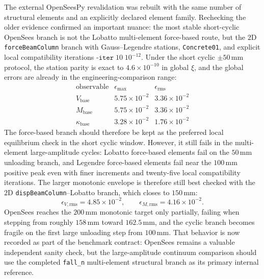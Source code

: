 The external OpenSeesPy revalidation was rebuilt with the same number of
structural elements and an explicitly declared element family.  Rechecking the
older evidence confirmed an important nuance: the most stable short-cyclic
OpenSees branch is not the Lobatto multi-element force-based route, but the
\(2\mathrm{D}\) \texttt{forceBeamColumn} branch with Gauss--Legendre stations,
\texttt{Concrete01}, and explicit local compatibility iterations
\(\texttt{-iter}\;10\;10^{-12}\).  Under the short cyclic
\(\pm 50\,\mathrm{mm}\) protocol, the station parity is exact to
\(4.6\times10^{-10}\) in global \(\xi\), and the global errors are already in
the engineering-comparison range:
\[
\begin{array}{l|r|r}
\text{observable} & \epsilon_{\max} & \epsilon_{\mathrm{rms}}\\
\hline
V_{\mathrm{base}} & 5.75\times10^{-2} & 3.36\times10^{-2}\\
M_{\mathrm{base}} & 5.75\times10^{-2} & 3.36\times10^{-2}\\
\kappa_{\mathrm{base}} & 3.28\times10^{-2} & 1.76\times10^{-2}
\end{array}
\]
The force-based branch should therefore be kept as the preferred local
equilibrium check in the short cyclic window.  However, it still fails in the
multi-element large-amplitude cycles: Lobatto force-based elements fail on the
\(50\,\mathrm{mm}\) unloading branch, and Legendre force-based elements fail
near the \(100\,\mathrm{mm}\) positive peak even with finer increments and
twenty-five local compatibility iterations.  The larger monotonic envelope is
therefore still best checked with the \(2\mathrm{D}\)
\texttt{dispBeamColumn}--Lobatto branch, which closes to
\(150\,\mathrm{mm}\):
\[
\epsilon_{V,\mathrm{rms}}=4.85\times10^{-2},\qquad
\epsilon_{M,\mathrm{rms}}=4.16\times10^{-2}.
\]
OpenSees reaches the \(200\,\mathrm{mm}\) monotonic target only partially,
failing when stepping from roughly \(158\,\mathrm{mm}\) toward
\(162.5\,\mathrm{mm}\), and the cyclic branch becomes fragile on the first
large unloading step from \(100\,\mathrm{mm}\).  That behavior is now recorded
as part of the benchmark contract: OpenSees remains a valuable independent
sanity check, but the large-amplitude continuum comparison should use the
completed \texttt{fall\_n} multi-element structural branch as its primary
internal reference.

